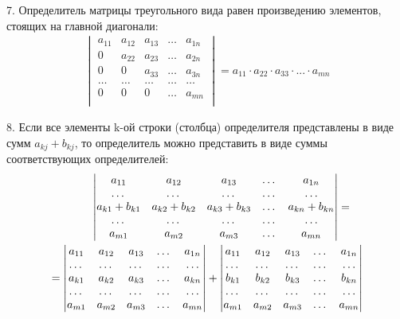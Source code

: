 \documentclass[a4paper,12pt]{extbook}
\theoremstyle{numbered}
\theoremstyle{named}
\theoremstyle{named}
\theoremstyle{named}
\begin{document}
7. Определитель матрицы треугольного вида равен произведению элементов, стоящих на главной диагонали:
\begin{gather*}
    \begin{vmatrix}
        a_{11} & a_{12} & a_{13} & \dots & a_{1n} \\
        0      & a_{22} & a_{23} & \dots & a_{2n} \\
        0      & 0      & a_{33} & \dots & a_{3n} \\
        \dots  & \dots  & \dots  & \dots & \dots  \\
        0      & 0      & 0      & \dots & a_{mn} \\
    \end{vmatrix}
    = a_{11} \cdot a_{22} \cdot a_{33} \cdot ... \cdot a_{mn}
\end{gather*}

8. Если все элементы k-ой строки (столбца) определителя представлены в виде сумм \(a_{kj} + b_{kj}\), то определитель можно представить в виде суммы соответствующих определителей:
\begin{gather*}
    \hspace{0.9cm}
    \begin{vmatrix}
        a_{11}          & a_{12}          & a_{13}          & \dots & a_{1n}          \\
        \dots           & \dots           & \dots           & \dots & \dots           \\
        a_{k1} + b_{k1} & a_{k2} + b_{k2} & a_{k3} + b_{k3} & \dots & a_{kn} + b_{kn} \\
        \dots           & \dots           & \dots           & \dots & \dots           \\
        a_{m1}          & a_{m2}          & a_{m3}          & \dots & a_{mn}          \\
    \end{vmatrix}
    =
    \\
    =
    \begin{vmatrix}
        a_{11} & a_{12} & a_{13} & \dots & a_{1n} \\
        \dots  & \dots  & \dots  & \dots & \dots  \\
        a_{k1} & a_{k2} & a_{k3} & \dots & a_{kn} \\
        \dots  & \dots  & \dots  & \dots & \dots  \\
        a_{m1} & a_{m2} & a_{m3} & \dots & a_{mn} \\
    \end{vmatrix}
    +
    \begin{vmatrix}
        a_{11} & a_{12} & a_{13} & \dots & a_{1n} \\
        \dots  & \dots  & \dots  & \dots & \dots  \\
        b_{k1} & b_{k2} & b_{k3} & \dots & b_{kn} \\
        \dots  & \dots  & \dots  & \dots & \dots  \\
        a_{m1} & a_{m2} & a_{m3} & \dots & a_{mn} \\
    \end{vmatrix}
\end{gather*}
\end{document}
